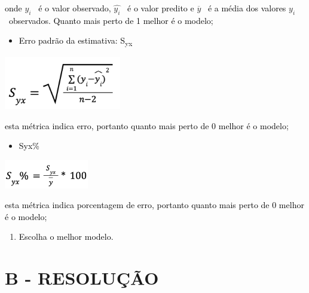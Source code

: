 \textcolor{black}{onde } $y_i$ \textcolor{black}{\ é o valor observado, } $\widehat {y_i}$ \textcolor{black}{\ é o valor
predito e } $\overline y$ \textcolor{black}{\ é a média dos valores } $y_i$ \textcolor{black}{\ observados. Quanto mais
perto de 1 melhor é o modelo;}



\begin{itemize}
\item \textcolor{black}{Erro padrão da estimativa: S}\textcolor{black}{\textsubscript{yx}}
\end{itemize}

\begin{center}
\includegraphics[width=5.117cm,height=2.32cm]{apendices/fig/IAA003_2.png} 
\end{center}

\textcolor{black}{esta métrica indica erro, portanto quanto mais perto de 0 melhor é o modelo;}



\begin{itemize}
\item \textcolor{black}{Syx\%}
\end{itemize}
\begin{center}
\includegraphics[width=3.688cm,height=1.235cm]{apendices/fig/IAA003_3.png}
\end{center}


\textcolor{black}{esta métrica indica porcentagem de erro, portanto quanto mais perto de 0 melhor é o modelo;}



\begin{enumerate}[resume*=listWWNumxx,start=7]
\item \textcolor{black}{Escolha o melhor modelo.}
\end{enumerate}

\section*{\textbf{B - RESOLUÇÃO}}
\lipsum[30]